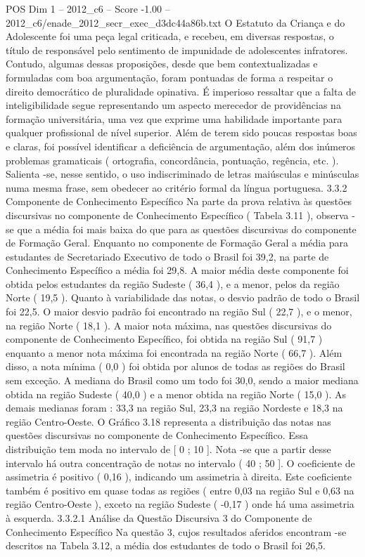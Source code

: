 \begin{textsample}{POS Dim 1 – 2012\_c6 – Score -1.00 – 2012\_c6/enade\_2012\_secr\_exec\_d3dc44a86b.txt}
O Estatuto da Criança e do Adolescente foi uma peça legal criticada, e recebeu, em diversas respostas, o título de responsável pelo sentimento de impunidade de adolescentes infratores.
Contudo, algumas dessas proposições, desde que bem contextualizadas e formuladas com boa argumentação, foram pontuadas de forma a respeitar o direito democrático de pluralidade opinativa.
É imperioso ressaltar que a falta de inteligibilidade segue representando um aspecto merecedor de providências na formação universitária, uma vez que exprime uma habilidade importante para qualquer profissional de nível superior.
Além de terem sido poucas respostas boas e claras, foi possível identificar a deficiência de argumentação, além dos inúmeros problemas gramaticais ( ortografia, concordância, pontuação, regência, etc. ).
Salienta -se, nesse sentido, o uso indiscriminado de letras maiúsculas e minúsculas numa mesma frase, sem obedecer ao critério formal da língua portuguesa. 3.3.2 Componente de Conhecimento Específico Na parte da prova relativa às questões discursivas no componente de Conhecimento Específico ( Tabela 3.11 ), observa -se que a média foi mais baixa do que para as questões discursivas do componente de Formação Geral.
Enquanto no componente de Formação Geral a média para estudantes de Secretariado Executivo de todo o Brasil foi 39,2, na parte de Conhecimento Específico a média foi 29,8.
A maior média deste componente foi obtida pelos estudantes da região Sudeste ( 36,4 ), e a menor, pelos da região Norte ( 19,5 ).
Quanto à variabilidade das notas, o desvio padrão de todo o Brasil foi 22,5.
O maior desvio padrão foi encontrado na região Sul ( 22,7 ), e o menor, na região Norte ( 18,1 ).
A maior nota máxima, nas questões discursivas do componente de Conhecimento Específico, foi obtida na região Sul ( 91,7 ) enquanto a menor nota máxima foi encontrada na região Norte ( 66,7 ).
Além disso, a nota mínima ( 0,0 ) foi obtida por alunos de todas as regiões do Brasil sem exceção.
A mediana do Brasil como um todo foi 30,0, sendo a maior mediana obtida na região Sudeste ( 40,0 ) e a menor obtida na região Norte ( 15,0 ).
As demais medianas foram : 33,3 na região Sul, 23,3 na região Nordeste e 18,3 na região Centro-Oeste.
O Gráfico 3.18 representa a distribuição das notas nas questões discursivas no componente de Conhecimento Específico.
Essa distribuição tem moda no intervalo de [ 0 ; 10 ].
Nota -se que a partir desse intervalo há outra concentração de notas no intervalo ( 40 ; 50 ].
O coeficiente de assimetria é positivo ( 0,16 ), indicando um assimetria à direita.
Este coeficiente também é positivo em quase todas as regiões ( entre 0,03 na região Sul e 0,63 na região Centro-Oeste ), exceto na região Sudeste ( -0,17 ) onde há uma assimetria à esquerda. 3.3.2.1 Análise da Questão Discursiva 3 do Componente de Conhecimento Específico Na questão 3, cujos resultados aferidos encontram -se descritos na Tabela 3.12, a média dos estudantes de todo o Brasil foi 26,5.

\end{textsample}
